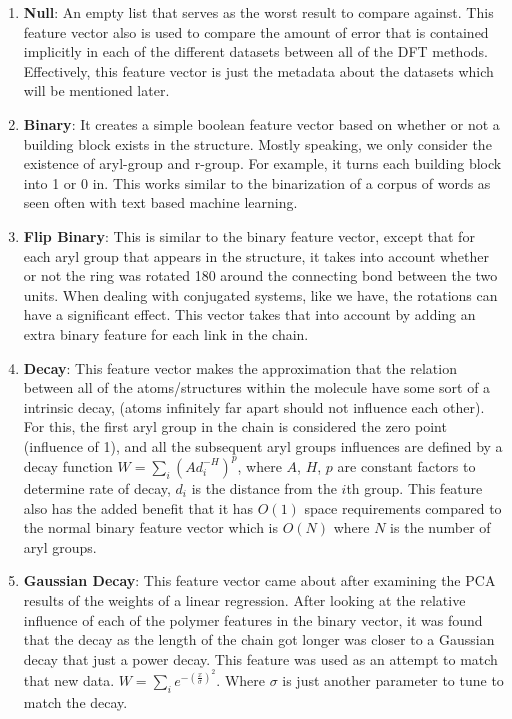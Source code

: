 \documentclass[10pt, oneside]{article}   	%
\begin{document}
\begin{enumerate}
\item \textbf{Null}: An empty list that serves as the worst result to compare against. This feature vector also is used to compare the amount of error that is contained implicitly in each of the different datasets between all of the DFT methods. Effectively, this feature vector is just the metadata about the datasets which will be mentioned later.

\item \textbf{Binary}: It creates a simple boolean feature vector based on whether or not a building block exists in the structure. Mostly speaking, we only consider the existence of aryl-group and r-group. For example, it turns each building block into 1 or 0 in. This works similar to the binarization of a corpus of words as seen often with text based machine learning.

\item \textbf{Flip Binary}: This is similar to the binary feature vector, except that for each aryl group that appears in the structure, it takes into account whether or not the ring was rotated 180 around the connecting bond between the two units. When dealing with conjugated systems, like we have, the rotations can have a significant effect. This vector takes that into account by adding an extra binary feature for each link in the chain.

\item \textbf{Decay}: This feature vector makes the approximation that the relation between all of the atoms/structures within the molecule have some sort of a intrinsic decay, (atoms infinitely far apart should not influence each other). For this, the first aryl group in the chain is considered the zero point (influence of 1), and all the subsequent aryl groups influences are defined by a decay function $ W = \sum_{i} (Ad_{i}^{-H})^{p}$, where $A$, $H$, $p$ are constant factors to determine rate of decay, $d_{i}$ is the distance from the $i$th group. This feature also has the added benefit that it has $O(1)$ space requirements compared to the normal binary feature vector which is $O(N)$ where $N$ is the number of aryl groups.

\item \textbf{Gaussian Decay}: This feature vector came about after examining the PCA results of the weights of a linear regression. After looking at the relative influence of each of the polymer features in the binary vector, it was found that the decay as the length of the chain got longer was closer to a Gaussian decay that just a power decay. This feature was used as an attempt to match that new data. $W = \sum_{i} e^{-\left(\frac{x}{\sigma}\right)^2} $. Where $\sigma$ is just another parameter to tune to match the decay.


\end{enumerate}
\end{document}
